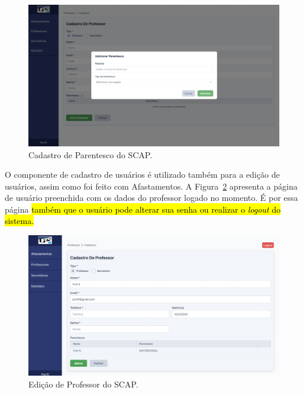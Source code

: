 \begin{figure}
    \centering
    \includegraphics[width=\textwidth]{figuras/prints-app/fig-modal-parentesco.png}
    \caption{Cadastro de Parentesco do SCAP.}
    \label{fig-parentesco}
\end{figure}


O componente de cadastro de usuários é utilizado também para a edição de usuários, assim como foi feito com Afastamentos. A Figura~\ref{fig-editar-professor}
apresenta a página de usuário preenchida com os dados do professor logado no momento. É por essa página \hl{também que o usuário pode alterar sua senha ou realizar o \textit{logout} do sistema.}

\begin{figure}[h!]
    \centering
    \includegraphics[width=\textwidth]{figuras/prints-app/fig-perfil.png}
    \caption{Edição de Professor do SCAP.}
    \label{fig-editar-professor}
\end{figure}

\FloatBarrier


